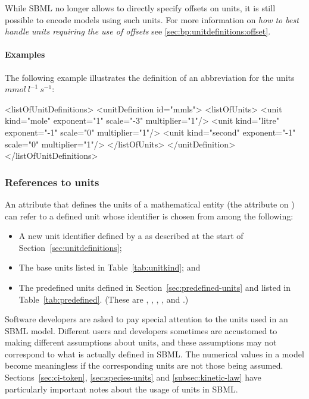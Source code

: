 While SBML no longer allows to directly specify offsets  on units, it is still possible
to encode models using such units. For more information on \emph{how to best 
handle units requiring the use of offsets} see \ref{sec:bp:unitdefinitions:offset}. 

\paragraph{Examples}

The following example illustrates the definition of an
abbreviation  for the units $mmol\ l^{-1}\ s^{-1}$:

\begin{example}
<listOfUnitDefinitions>
    <unitDefinition id="mmls">
        <listOfUnits>
            <unit kind="mole"   exponent="1"  scale="-3" multiplier="1"/>
            <unit kind="litre"  exponent="-1" scale="0"  multiplier="1"/>
            <unit kind="second" exponent="-1" scale="0"  multiplier="1"/>
        </listOfUnits>
    </unitDefinition>
</listOfUnitDefinitions>
\end{example}

\subsubsection{References to units}

An attribute that defines the units of a mathematical entity (\eg the
attribute  on \Parameter) can refer to a defined unit
whose identifier is chosen from among the following:
\begin{itemize}
  
\item A new unit identifier defined by a \UnitDefinition as
  described at the start of Section~\ref{sec:unitdefinitions};

\item The base units listed in Table~\vref{tab:unitkind}; and
  
\item The predefined units defined in
  Section~\ref{sec:predefined-units} and listed in
  Table~\ref{tab:predefined}.  (These are ,
  , , , and .)

\end{itemize}

Software developers are asked to pay special attention to the
units used in an SBML model.  Different users and developers
sometimes are accustomed to making different assumptions about
units, and these assumptions may not correspond to what is
actually defined in SBML.  The numerical values in a model become
meaningless if the corresponding units are not those being
assumed.  Sections~\ref{sec:ci-token}, \ref{sec:species-units} and
\ref{subsec:kinetic-law} have particularly important notes about
the usage of units in SBML.

